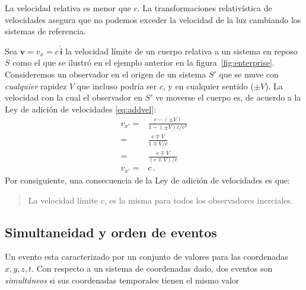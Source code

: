 \begin{frame}
\begin{itemize}
La velocidad relativa es menor que $c$. La transformaciones relativística de velocidades asegura que no podemos exceder la velocidad de la luz cambiando los sistemas de referencia. 
\end{itemize}

Sea $\mathbf{v}=v_{x}=c\,\hat{\mathbf{i}}$ la velocidad límite de un cuerpo relativa a un sistema en reposo $S$ como el que se ilustró en el ejemplo anterior en la figura~\ref{fig:enterprise}. Consideremos un observador en el origen de un sistema $S'$ que se muve con \emph{cualquier} rapidez $V$ que incluso podría ser $c$, y en cualquier sentido ($\pm V$). La velocidad con la cual el observador en $S'$ ve moverse el cuerpo es, de acuerdo a  la Ley de adición de velocidades \eqref{eq:addvel}:
\begin{align*}
  v_{x'}=&\frac{c-(\pm V)}{1-(\pm V)c/c^2}\nonumber\\
  =&\frac{c\mp V}{1\mp V/c}\nonumber\\
  =&\frac{c\mp V}{(c\mp V)/c}\nonumber\\
  v_{x'}=&c\,.
\end{align*}
Por consiguiente, una consecuencia de la Ley de adición de velocidades es que:
\begin{quote}
  La velocidad límite $c$, es la misma para todos los observadores inerciales.
\end{quote}

\end{frame}
\subsection{Simultaneidad y orden de eventos}

\begin{frame}
Un evento esta caracterizado por un conjunto de valores para las coordenadas $x,y,z,t$.  Con respecto a un sistema de coordenadas dado, dos eventos son \emph{simultáneos} si sus coordenadas temporales tienen el mismo valor
\end{frame}

